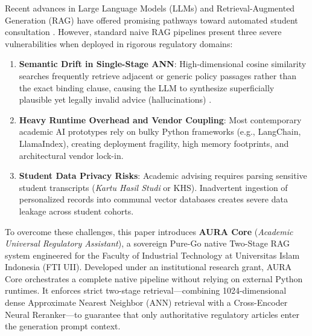 \documentclass[conference]{IEEEtran}
\begin{document}
Recent advances in Large Language Models (LLMs) and Retrieval-Augmented Generation (RAG) have offered promising pathways toward automated student consultation \cite{lewis2020retrieval, gao2023retrieval}. However, standard naive RAG pipelines present three severe vulnerabilities when deployed in rigorous regulatory domains:
\begin{enumerate}
    \item \textbf{Semantic Drift in Single-Stage ANN}: High-dimensional cosine similarity searches frequently retrieve adjacent or generic policy passages rather than the exact binding clause, causing the LLM to synthesize superficially plausible yet legally invalid advice (hallucinations) \cite{ji2023survey, huang2023survey}.
    \item \textbf{Heavy Runtime Overhead and Vendor Coupling}: Most contemporary academic AI prototypes rely on bulky Python frameworks (e.g., LangChain, LlamaIndex), creating deployment fragility, high memory footprints, and architectural vendor lock-in.
    \item \textbf{Student Data Privacy Risks}: Academic advising requires parsing sensitive student transcripts (\textit{Kartu Hasil Studi} or KHS). Inadvertent ingestion of personalized records into communal vector databases creates severe data leakage across student cohorts.
\end{enumerate}

To overcome these challenges, this paper introduces \textbf{AURA Core} (\textit{Academic Universal Regulatory Assistant}), a sovereign Pure-Go native Two-Stage RAG system engineered for the Faculty of Industrial Technology at Universitas Islam Indonesia (FTI UII). Developed under an institutional research grant, AURA Core orchestrates a complete native pipeline without relying on external Python runtimes. It enforces strict two-stage retrieval—combining 1024-dimensional dense Approximate Nearest Neighbor (ANN) retrieval with a Cross-Encoder Neural Reranker—to guarantee that only authoritative regulatory articles enter the generation prompt context.
\end{document}
